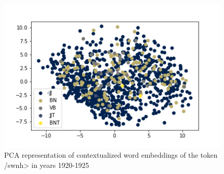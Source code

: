\documentclass[10pt, a4paper]{article}
\begin{document}
\begin{figure}[!h]
\begin{center}
\includegraphics[scale=0.5]{code/embeddings_by_pos/שונה_1920.png}
\caption{PCA representation of contextualized word embeddings of the token \</swnh> in years 1920-1925}
\label{embeddings_pos}
\end{center}
\end{figure}


\end{document}
